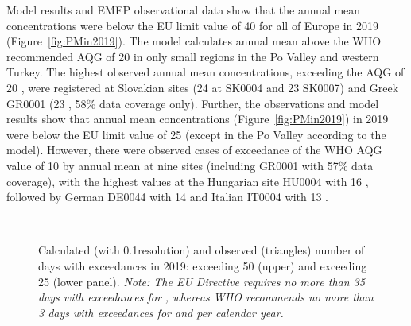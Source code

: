 Model results and EMEP observational data show that the annual mean \PM[10] concentrations were below the EU limit value of 40 \ug for all of Europe in 2019 (Figure~\ref{fig:PMin2019}). The model calculates annual mean \PM[10] above the WHO recommended AQG of 20 \ug
in only small regions in the Po Valley and western Turkey. The highest
observed annual mean \PM[10] concentrations, exceeding the AQG of 20 \ug, were registered at Slovakian sites (24 \ug at SK0004 and 23 \ug SK0007) and Greek GR0001 (23 \ug, 58\% data coverage only). Further, the observations and model results show that annual mean \PM[2.5] concentrations (Figure~\ref{fig:PMin2019}) in 2019 were below the EU limit value of 25 \ug (except in the Po Valley according to the model). However, there were observed cases of exceedance of the WHO AQG value of 10 \ug by annual mean \PM[2.5] at nine sites (including GR0001 with 57\% data coverage), with the highest values at the Hungarian site HU0004 with 16 \ug, followed by German DE0044 with 14 \ug and Italian IT0004 with 13 \ug.


\begin{figure}[ht]
  \\
  \vspace{0.5cm}
\caption{Calculated (with 0.1\degrees resolution) and observed (triangles) number of days with
  exceedances in 2019: \PM[10] exceeding 50 \ug (upper) and \PM[2.5]
  exceeding 25 \ug (lower panel). \textit{Note: The EU Directive requires no
    more than 35 days with exceedances for \PM[10], whereas WHO
    recommends no more than 3 days with exceedances for \PM[10] and
    \PM[2.5] per calendar year. }}
\label{fig:PMexceed}
\end{figure}


